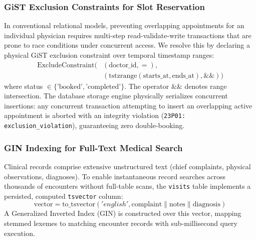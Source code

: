 \documentclass[conference]{IEEEtran}
\begin{document}
\subsubsection{GiST Exclusion Constraints for Slot Reservation}
In conventional relational models, preventing overlapping appointments for an individual physician requires multi-step read-validate-write transactions that are prone to race conditions under concurrent access. We resolve this by declaring a physical GiST exclusion constraint over temporal timestamp ranges:
\begin{equation}
\begin{aligned}
\text{ExcludeConstraint}\Big(&(\text{doctor\_id}, =), \\
&(\text{tstzrange}(\text{starts\_at}, \text{ends\_at}), \&\&)\Big)
\end{aligned}
\end{equation}
where status $\in \{\text{'booked'}, \text{'completed'}\}$. The operator $\&\&$ denotes range intersection. The database storage engine physically serializes concurrent insertions: any concurrent transaction attempting to insert an overlapping active appointment is aborted with an integrity violation (\texttt{23P01: exclusion\_violation}), guaranteeing zero double-booking.

\subsubsection{GIN Indexing for Full-Text Medical Search}
Clinical records comprise extensive unstructured text (chief complaints, physical observations, diagnoses). To enable instantaneous record searches across thousands of encounters without full-table scans, the \texttt{visits} table implements a persisted, computed \texttt{tsvector} column:
\begin{equation}
\text{vector} = \text{to\_tsvector}('english', \text{complaint} \parallel \text{notes} \parallel \text{diagnosis})
\end{equation}
A Generalized Inverted Index (GIN) is constructed over this vector, mapping stemmed lexemes to matching encounter records with sub-millisecond query execution.
\end{document}
